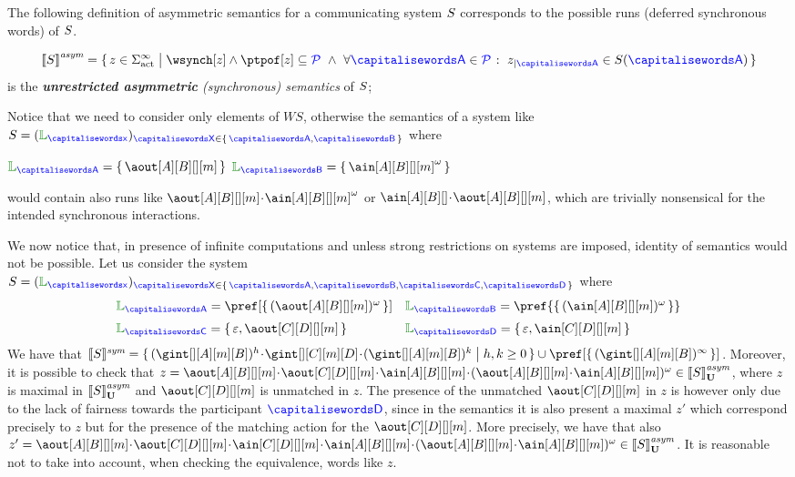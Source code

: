 The following definition of asymmetric semantics for a communicating system $S$ corresponds
to the possible runs (deferred synchronous words) of  $S$.



\begin{definition}
 \[
	 \asem{\aCS} = \Set{z \in \alfact^\infty \sst \wsynch[z] \land\ptpof[z] \subseteq \ptpset \ \land\ \forall \p \in
		\ptpset \qst \filter{z}{\p} \in \aCS(\p)  }
  \]
  is the \emph{{\bf unrestricted asymmetric} (synchronous) semantics} of $S$;
\end{definition}

Notice that we need to consider only elements of $WS$, otherwise the semantics of a system like
$\aCS = ({\alang}_{\px})_{\ptp[X] \in \Set{\p,\q}}$ where\\
\centerline{$\alang_{\p}= \Set{\aout[A][B][][m]}$ \qquad $\alang_{\q}= \Set{\ain[A][B][][m]^\omega}$ }
would contain also runs like 
$\aout[A][B][][m]\cat\ain[A][B][][m]^\omega$ or $\ain[A][B][]\cat\aout[A][B][][m]$, which are trivially nonsensical for the intended synchronous interactions.


We now notice that, in presence of infinite computations and unless strong restrictions on systems are imposed, 
identity of semantics would not be possible.
Let us consider the system
$\aCS = ({\alang}_{\px})_{\ptp[X] \in \Set{\p,\q, \ptp[C], \ptp[D]}}$ where
$$\begin{array}{ll}
\alang_{\p}= \pref[\Set{(\aout[A][B][][m])^\omega}] &
\alang_{\q}= \pref{\Set{(\ain[A][B][][m])^\omega}}  \\[2mm]
\alang_{\ptp[C]}= \Set{\emptyword, \aout[C][D][][m]} &
\alang_{\ptp[D]}= \Set{\emptyword,\ain[C][D][][m]}
\end{array}$$
We have that 
$\ssem{\aCS} = 
\Set{(\gint[][A][m][B])^h\cat\gint[][C][m][D]\cat(\gint[][A][m][B])^k \sst h,k\geq 0}\cup\pref[\Set{(\gint[][A][m][B])^\infty}]$.
Moreover, it is possible to check that 
$z = \aout[A][B][][m]\cat\aout[C][D][][m]\cat\ain[A][B][][m]\cat(\aout[A][B][][m]\cat\ain[A][B][][m])^\omega\in\gasem{\aCS}$, where $z$ is maximal in ${\llbracket S \rrbracket}^{\textit{asym}}_{\mathbf{U}}$ and  $\aout[C][D][][m]$ is unmatched in $z$.
The presence of the unmatched $\aout[C][D][][m]$ in $z$ is however only due to the lack
of fairness towards the participant $\ptp[D]$, since in the semantics it is also present
a maximal $z'$ which correspond precisely to $z$ but for the presence of the matching
action for the $\aout[C][D][][m]$. More precisely, we have
that also  $z' = \aout[A][B][][m]\cat\aout[C][D][][m]\cat\ain[C][D][][m]\cat\ain[A][B][][m]\cat(\aout[A][B][][m]\cat\ain[A][B][][m])^\omega\in\gasem{\aCS}$.
It is reasonable not to take into account, when checking the equivalence, words like $z$.

